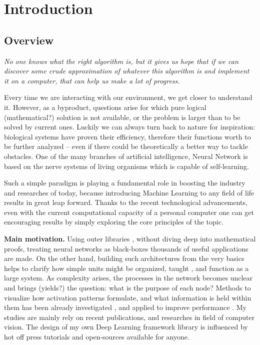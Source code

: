 \chapter{Introduction}
\section{Overview}


\epigraph{\textit{No one knows what the right algorithm is, but it gives us hope that if we can discover some crude approximation of whatever this algorithm is and implement it on a computer, that can help us make a lot of progress.}}{}

Every time we are interacting with our environment, we get closer to understand it. %
However, as a byproduct, questions arise for which pure logical (mathematical?) solution is not available, or the problem is larger than to be solved by current ones.
Luckily we can always turn back to nature for inspiration: biological systems have proven their efficiency, therefore their functions worth to be further analyzed -- even if there could be theoretically a better way to tackle obstacles. 
One of the many branches of artificial intelligence, Neural Network is based on the nerve systems of living organisms which is capable of self-learning.

Such a simple paradigm is playing a fundamental role in boosting the industry and researches of today, because introducing Machine Learning to any field of life results in great leap forward. 
Thanks to the recent technological advancements, even with the current computational capacity of a personal computer one can get encouraging results by simply exploring the core principles of the topic.

\textbf{Main motivation.} Using outer libraries \cite{TF, torch, caffe}, without diving deep into mathematical proofs, treating neural networks as black-boxes thousands of useful applications \cite{haykin2004comprehensive} are made. 
On the other hand, building such architectures from the very basics helps to clarify how simple units might be organized, taught \cite{werbos1994roots}, and function \cite{hornik1989multilayer} as a large system. 
As complexity arises, the processes in the network becomes unclear and brings (yields?) the question: what is the purpose of each node? Methods to visualize how activation patterns formulate, and what information is held within them has been already investigated \cite{yosinski2015understanding}, and applied to improve performance \cite{zeiler2014visualizing}. My studies are mainly rely on recent publications, and researches in field of computer vision. The design of my own Deep Learning framework library is influenced by hot off press tutorials \cite{Goodfellow-et-al-2016-Book, deeplearningdotnet, nnsdl, stanfordlectures, gibiansky} and open-sources \cite{TF, torch, caffe} available for anyone. 


